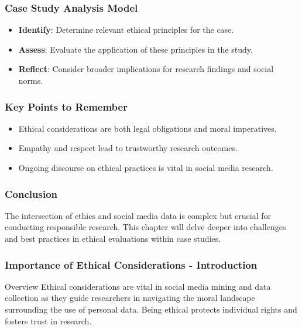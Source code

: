 \documentclass{beamer}
\begin{document}
\begin{frame}[fragile]
    \frametitle{Case Study Analysis Model}
    \begin{itemize}
        \item \textbf{Identify}: Determine relevant ethical principles for the case.
        \item \textbf{Assess}: Evaluate the application of these principles in the study.
        \item \textbf{Reflect}: Consider broader implications for research findings and social norms.
    \end{itemize}
\end{frame}

\begin{frame}[fragile]
    \frametitle{Key Points to Remember}
    \begin{itemize}
        \item Ethical considerations are both legal obligations and moral imperatives.
        \item Empathy and respect lead to trustworthy research outcomes.
        \item Ongoing discourse on ethical practices is vital in social media research.
    \end{itemize}
\end{frame}

\begin{frame}[fragile]
    \frametitle{Conclusion}
    The intersection of ethics and social media data is complex but crucial for conducting responsible research. 
    This chapter will delve deeper into challenges and best practices in ethical evaluations within case studies.
\end{frame}

\begin{frame}[fragile]
    \frametitle{Importance of Ethical Considerations - Introduction}
    \begin{block}{Overview}
        Ethical considerations are vital in social media mining and data collection as they guide researchers in navigating the moral landscape surrounding the use of personal data. 
        Being ethical protects individual rights and fosters trust in research.
    \end{block}
\end{frame}
\end{document}
